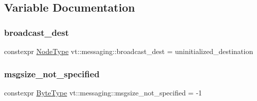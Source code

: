 \subsection{Variable Documentation}
\mbox{\label{namespacevt_1_1messaging_a11d2b356f56486f2e60f0255cb6b05ff}} 
\subsubsection{\texorpdfstring{broadcast\+\_\+dest}{broadcast\_dest}}
{\footnotesize\ttfamily constexpr \hyperlink{namespacevt_a866da9d0efc19c0a1ce79e9e492f47e2}{Node\+Type} vt\+::messaging\+::broadcast\+\_\+dest = uninitialized\+\_\+destination}

\mbox{\label{namespacevt_1_1messaging_adefd943a6421b1b7120526f969bee20f}} 
\subsubsection{\texorpdfstring{msgsize\+\_\+not\+\_\+specified}{msgsize\_not\_specified}}
{\footnotesize\ttfamily constexpr \hyperlink{namespacevt_aab8d55968084610ce3b17057981e9300}{Byte\+Type} vt\+::messaging\+::msgsize\+\_\+not\+\_\+specified = -\/1}

